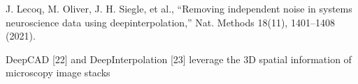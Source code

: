 J. Lecoq, M. Oliver, J. H. Siegle, et al., “Removing independent noise in systems neuroscience data using deepinterpolation,” Nat. Methods 18(11), 1401–1408 (2021).

DeepCAD [22] and DeepInterpolation [23] leverage the 3D spatial information of microscopy image stacks

